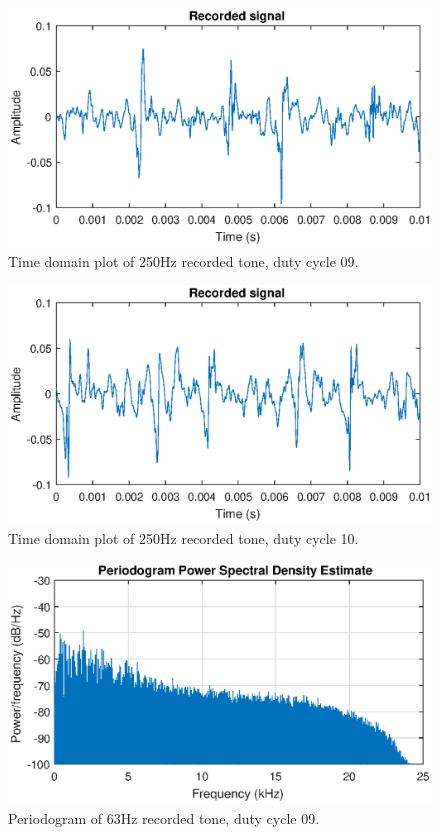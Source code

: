 \begin{figure}[H]
    \centering
    \includegraphics[trim={0cm 1.6cm 0cm 2cm},clip,width=\textwidth]{img/akustisk/Waveform_250Hz-09.eps}
    \caption{Time domain plot of 250Hz recorded tone, duty cycle 09.}
    \label{fig:appdx:wave_250-09}
\end{figure}
\begin{figure}[H]
    \centering
    \includegraphics[trim={0cm 1.6cm 0cm 2cm},clip,width=\textwidth]{img/akustisk/Waveform_250Hz-10.eps}
    \caption{Time domain plot of 250Hz recorded tone, duty cycle 10.}
    \label{fig:appdx:wave_250-10}
\end{figure}
\begin{figure}[H]
    \centering
    \includegraphics[trim={0cm 1.6cm 0cm 2cm},clip,width=\textwidth]{img/akustisk/Periodogram_63Hz-09.eps}
    \caption{Periodogram of 63Hz recorded tone, duty cycle 09.}
    \label{fig:period_63-09}
\end{figure}
